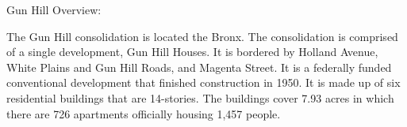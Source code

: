 Gun Hill Overview:   

  

The Gun Hill consolidation is located the Bronx. The consolidation is comprised of a single development, Gun Hill Houses. It is bordered by Holland Avenue, White Plains and Gun Hill Roads, and Magenta Street.  It is a federally funded conventional development that finished construction in 1950. It is made up of six residential buildings that are 14-stories. The buildings cover 7.93  acres in which there are 726 apartments officially housing 1,457 people.   